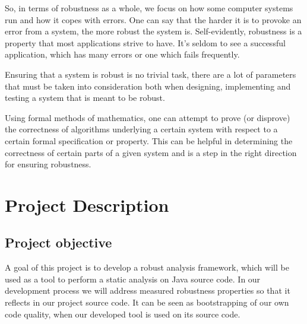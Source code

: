   So, in terms of robustness as a whole, we focus on how some computer systems run and how it copes with errors. One can say that the harder it is to provoke an error from a system, the more robust the system is. Self-evidently, robustness is a property that most applications strive to have. It's seldom to see a successful application, which has many errors or one which fails frequently.

  Ensuring that a system is robust is no trivial task, there are a lot of parameters that must be taken into consideration both when designing, implementing and testing a system that is meant to be robust. 

  Using formal methods of mathematics, one can attempt to prove (or disprove) the correctness of algorithms underlying a certain system with respect to a certain formal specification or property. This can be helpful in determining the correctness of certain parts of a given system and is a step in the right direction for ensuring robustness.
  
\section{Project Description}

  \subsection{Project objective}
    A goal of this project is to develop a robust analysis framework, which will be used as a tool to perform a static analysis on Java source code. In our development process we will address measured robustness properties so that it reflects in our project source code. It can be seen as bootstrapping of our own code quality, when our developed tool is used on its source code.

